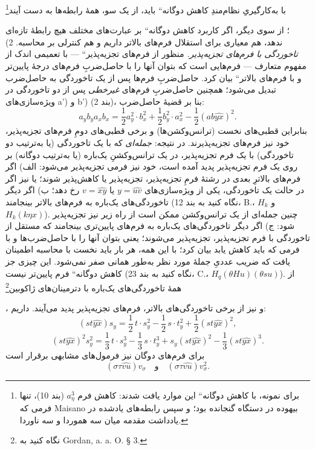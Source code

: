 \documentclass[11pt]{article}
\providecommand{\glqq}{\textquotedblbase}
\providecommand{\grqq}{\textquotedblleft}
\newcommand{\srcLTR}[1]{\relax\ifmmode\text{\mbox{\babelsublr{\foreignlanguage{english}{#1}}}}\else\babelsublr{\foreignlanguage{english}{#1}}\fi}
\newcommand{\srcfn}[2]{\begingroup\renewcommand{\thefootnote}{\srcLTR{#1}}\footnote{#2}\addtocounter{footnote}{-1}\endgroup}
\begin{document}
با به‌کارگیریِ نظام‌مندِ \glqq{}کاهش دوگانه\grqq{} باید، از یک سو، همهٔ رابطه‌ها به دست آیند\srcfn{**)}{برای نمونه، با \glqq{}کاهش دوگانه\grqq{} این موارد یافت شدند: کاهش فرم $a_\eta^3$ (بند 10)، تنها فرمی که Maisano بیهوده در دستگاه گنجانده بود؛ و سپس رابطه‌های یادشده در یادداشت مقدمه میان سه هموردا و سه ناوردا.}؛ از سوی دیگر، اگر کاربرد \glqq{}کاهش دوگانه\grqq{} بر عبارت‌های مختلف هیچ رابطهٔ تازه‌ای ندهد، هم معیاری برای استقلال فرم‌های بالاتر داریم و هم کنترلی بر محاسبه.
2) \emph{تاخوردگی با فرم‌های تجزیه‌پذیر.}
منظور از \glqq{}فرم‌های تجزیه‌پذیر\grqq{} --- با تعمیمی اندک از مفهوم متعارف --- فرم‌هایی است که بتوان آنها را با حاصل‌ضربِ فرم‌های درجهٔ پایین‌تر و با \glqq{}فرم‌های بالاتر\grqq{} بیان کرد. حاصل‌ضربِ فرم‌ها پس از یک تاخوردگی به حاصل‌ضرب تبدیل می‌شود؛ همچنین حاصل‌ضربِ فرم‌های \emph{غیرخطی} پس از دو تاخوردگی در ویژه‌سازی‌های a') و b') (بند 2)، بنا بر قضیهٔ حاصل‌ضرب:
\[
a_yb_y a_xb_x=\frac12a_y^2\cdot b_x^2+\frac12b_y^2\cdot a_x^2-\frac12(ab\widehat{yx})^2.
\]
بنابراین قطبی‌های نخست (ترانس‌وکشن‌ها) و برخی قطبی‌های دومِ فرم‌های تجزیه‌پذیر، خود نیز فرم‌های تجزیه‌پذیرند. در نتیجه:
\emph{جمله‌ای} که با یک تاخوردگی (یا به‌ترتیب دو تاخوردگی) با یک فرم تجزیه‌پذیر، در یک ترانس‌وکشنِ یک‌باره (یا به‌ترتیب دوگانه) بر روی یک فرم تجزیه‌پذیر پدید آمده است، خود نیز فرمی تجزیه‌پذیر می‌شود:
الف) اگر فرم‌های بالاترِ بعدی در رشتهٔ فرمِ تجزیه‌پذیر، تجزیه‌پذیر یا کاهش‌پذیر شوند؛ یا نیز اگر در حالت یک تاخوردگی، یکی از ویژه‌سازی‌های $y=\widehat{uv}$ یا $v=\widehat{xy}$ رخ دهد؛
ب) اگر دیگر تاخوردگی‌های یک‌باره به فرم‌های بالاتر بینجامند (نگاه کنید به بند 12، B.، $H_k$ و $H_k(k\eta x)$).
چنین جمله‌ای از یک ترانس‌وکشن ممکن است از راه زیر نیز تجزیه‌پذیر شود:
ج) اگر دیگر تاخوردگی‌های یک‌باره به فرم‌های پایین‌تری بینجامند که مستقل از تاخوردگی با فرم تجزیه‌پذیر، تجزیه‌پذیر می‌شوند؛ یعنی بتوان آنها را با حاصل‌ضرب‌ها و با فرمی که باید کاهش یابد بیان کرد؛ با این همه، هر بار باید نخست با محاسبه اطمینان یافت که ضریب عددیِ جملهٔ مورد نظر به‌طور همانی صفر نمی‌شود. این چیزی جز \glqq{}کاهش دوگانه\grqq{} فرم پایین‌تر نیست (نگاه کنید به بند 23، C.، $H_q(\theta H u)(\theta s u)$).
از همهٔ تاخوردگی‌های یک‌باره با دترمینان‌های ژاکوبین\srcfn{*)}{نگاه کنید به Gordan, a. a. O. § 3.}، و نیز از برخی تاخوردگی‌های بالاتر، فرم‌های تجزیه‌پذیر پدید می‌آیند. داریم:
\[
(st\widehat{yx})s_y=\frac12\,t\cdot s_y^2-\frac12\,s\cdot t_y^2+\frac12(st\widehat{yx})^2,
\]
\[
(st\widehat{yx})^2s_y^2=\frac13\,t\cdot s_y^3-\frac13\,s\cdot t_y^3+s_y(st\widehat{yx})^2-\frac13(st\widehat{yx})^3.
\]
برای فرم‌های دوگان نیز فرمول‌های مشابهی برقرار است
\[
(\sigma\tau\widehat{vu})v_\sigma
\quad\text{و}\quad
(\sigma\tau\widehat{vu})v_\sigma^2.
\]
\end{document}

